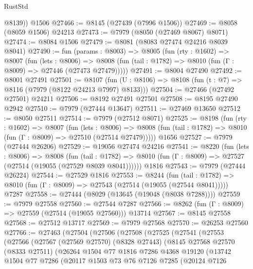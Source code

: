 \begin{lexlean}{RustStd}
\begin{coremodule}
        @8139))
    @1506
@27466 := @8145 (@27439 (@7996 @1506))
@27469 := @8058 (@8059 @1506) @24213
@27473 := @7979 (@8050 (@27469 @8067) @8071)
@27474 := @8084 @1506
@27479 := @8081 (@8083 @27474 @24216 @8039 @8041)
@27490 := fun (params : @8003) =>
  @8005
    (fun (rty : @1602) =>
    @8007
      (fun (lets : @8006) =>
      @8008 (fun (tail : @1782) => @8010 (fun (Γ : @8009) => @27446 (@27473 @27479)))))
@27491 := @8004 @27490
@27492 := @8001 @27491
@27501 := @8107
    (fun (U : @8106) => @8108 (fun (t : @7) => @8116 (@7979 (@8122 @24213 @7997) @8133)))
@27504 := @27466 (@27492 @27501) @24211
@27506 := @8192 @27491 @27501
@27508 := @8195 @27490 @2942
@27510 := @7979 (@27444 @13647)
@27511 := @27469 @13650
@27512 := @8050 @27511
@27514 := @7979 (@27512 @8071)
@27525 := @8198
    (fun (rty : @1602) =>
    @8007
      (fun (lets : @8006) =>
      @8008 (fun (tail : @1782) => @8010 (fun (Γ : @8009) => @27510 (@27514 @27479)))))
    @1656
@27527 := @7979 (@27444 @26206)
@27529 := @19056 @27474 @24216
@27541 := @8220
    (fun (lets : @8006) =>
    @8008
      (fun (tail : @1782) =>
      @8010 (fun (Γ : @8009) => @27527 (@27514 (@19055 (@27529 @8039 @8041))))))
    @1816
@27543 := @7979 (@27444 @26224)
@27544 := @27529 @1816
@27553 := @8244
    (fun (tail : @1782) => @8010 (fun (Γ : @8009) => @27543 (@27514 (@19055 (@27544 @8041)))))
    @7287
@27558 := @27444 (@8029 (@13645 (@19048 (@8038 @7288))))
@27559 := @7979 @27558
@27560 := @27544 @7287
@27566 := @8262 (fun (Γ : @8009) => @27559 (@27514 (@19055 @27560))) @13714
@27567 := @8145 @27558
@27568 := @27512 @13717
@27569 := @7979 @27568
@27570 := @26253 @27560
@27766 := @27463
    (@27504
      (@27506
        (@27508
          (@27525
            (@27541
              (@27553
                (@27566
                  (@27567
                    (@27569 @27570)
                    (@8328 @27443)
                    (@8145
                      @27568
                      @27570
                      (@8333 @27511)
                      (@26264
                        @1504
                        @77
                        @1816
                        @7286
                        @4368
                        @19120
                        (@13742
                          @1504
                          @77
                          @7286
                          (@20117
                            @1503
                            @73
                            @76
                            @7126
                            @7285
                            (@20124
                              @7126

\end{coremodule}
\end{lexlean}
